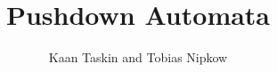 \documentclass[11pt,a4paper]{article}
\begin{document}
\title{Pushdown Automata}
\author{Kaan Taskin and Tobias Nipkow}
\maketitle

\tableofcontents





\end{document}
